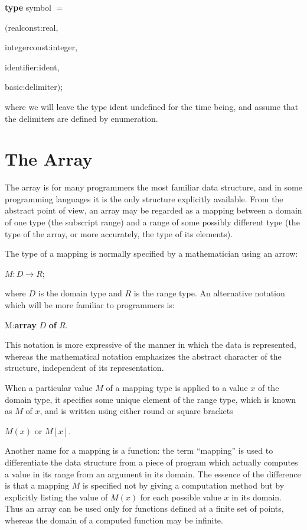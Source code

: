 \documentclass[twoside,11pt]{book}
\begin{document}
\quad \textbf{type} symbol $=$

\tabto*{5.6em}$($realconst:real,

\tabto*{6em}integerconst:integer,

\tabto*{6em}identifier:ident,

\tabto*{6em}basic:delimiter$)$;

\noindent
where we will leave the type ident undefined for the time being, and assume that the delimiters are defined by enumeration.

\section[The array]{The Array}
\label{sec:array}

The array is for many programmers the most familiar data structure, and in some programming languages it is the only structure explicitly available. From the abstract point of view, an array may be regarded as a mapping between a domain of one type (the subscript range) and a range of some possibly different type (the type of the array, or more accurately, the type of its elements).

The type of a mapping is normally specified by a mathematician using an arrow:

\quad $M:D\rightarrow R$;

\noindent
where $D$ is the domain type and $R$ is the range type. An alternative notation which will be more familiar to programmers is:

\quad M:\textbf{array} $D$ \textbf{of} $R$.

\noindent
This notation is more expressive of the manner in which the data is represented, whereas the mathematical notation emphasizes the abstract character of the structure, independent of its representation.

When a particular value $M$ of a mapping type is applied to a value $x$ of the domain type, it specifies some unique element of the range type, which is known as $M$ of $x$, and is written using either round or square brackets

\quad $M(x)$ or $M[x]$.

\noindent
Another name for a mapping is a function: the term ``mapping'' is used to differentiate the data structure from a piece of program which actually computes a value in its range from an argument in its domain. The essence of the difference is that a mapping $M$ is specified not by giving a computation method but by explicitly listing the value of $M(x)$ for each possible value $x$ in its domain. Thus an array can be used only for functions defined at a finite set of points, whereas the domain of a computed function may be infinite.
\end{document}
